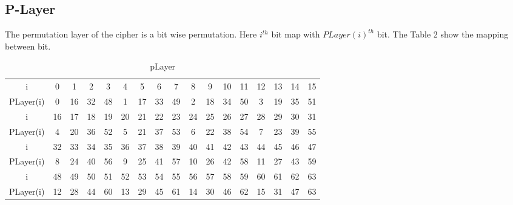 \documentclass[journal=tosc,preprint]{iacrtrans}
\begin{document}
\subsection{P-Layer}
The permutation layer of the cipher  is a bit wise permutation. Here $i^{th}$ bit map with $PLayer(i)^{th}$ bit. The Table 2 show the mapping between bit.
\begin{table}[h!]
	\caption{pLayer}
	\centering
	\begin{tabular}{ |c||c|c|c|c|c|c|c|c|c|c|c|c|c|c|c|c| }
		\hline
		i& 0 &1 &2 &3& 4& 5& 6 &7 &8 &9 &10 &11 &12 &13 &14 &15 \\
		PLayer(i) &0& 16& 32& 48& 1& 17& 33&49& 2 &18& 34& 50& 3 &19 &35 &51 \\\hline\hline
		i &16& 17& 18& 19& 20& 21 &22& 23 &24 &25 &26 &27 &28 &29 &30 &31 \\
		PLayer(i)& 4 &20 &36& 52& 5& 21 &37& 53& 6 &22& 38& 54& 7 &23 &39 &55 \\\hline\hline
		i &32& 33& 34& 35& 36& 37 &38& 39 &40 &41 &42 &43 &44 &45 &46 &47 \\
		PLayer(i) &8 &24& 40& 56 &9& 25 &41 &57 &10 &26 &42 &58 &11 &27 &43 &59 \\\hline\hline
		i &48& 49& 50 &51 &52 &53& 54& 55 &56 &57 &58 &59 &60 &61 &62 &63 \\
		PLayer(i) &12& 28& 44&60& 13 &29& 45& 61 &14 &30 &46 &62 &15 &31 &47 &63 \\\hline
	\end{tabular}
	
\end{table}
\end{document}
